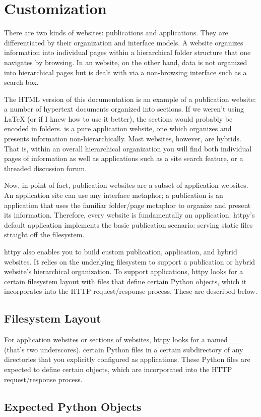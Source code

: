 \chapter{Customization}

There are two kinds of websites: publications and applications. They are
differentiated by their organization and interface models. A 
website organizes information into individual pages within a hierarchical folder
structure that one navigates by browsing. In an  website, on
the other hand, data is not organized into hierarchical pages but is dealt with
via a non-browsing interface such as a search box.

The HTML version of this documentation is an example of a publication website: a
number of hypertext documents organized into sections. If we weren't using LaTeX
(or if I knew how to use it better), the sections would probably be encoded in
folders.  is a pure application
website, one which organizes and presents information non-hierarchically. Most
websites, however, are hybrids. That is, within an overall hierarchical
organization you will find both individual pages of information as well as
applications such as a site search feature, or a threaded discussion forum.

Now, in point of fact, publication websites are a subset of application
websites. An application site can use any interface metaphor; a publication is
an application that uses the familiar folder/page metaphor to organize and
present its information. Therefore, every website is fundamentally an
application. httpy's default application implements the basic publication
scenario: serving static files straight off the filesystem.

httpy also enables you to build custom publication, application, and hybrid
websites. It relies on the underlying filesystem to support a publication or
hybrid website's hierarchical organization. To support applications, httpy looks
for a certain filesystem layout with files that define certain Python objects,
which it incorporates into the HTTP request/response process. These are
described below.



\section{Filesystem Layout}

For application websites or sections of websites, httpy looks for a  named __ (that's two underscores). certain Python files in a certain
subdirectory of any directories that you explicitly configured as applications.
These Python files are expected to define certain objects, which are
incorporated into the HTTP request/response process.



\section{Expected Python Objects}